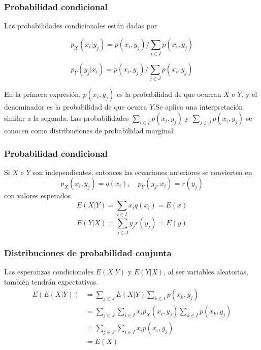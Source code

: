\documentclass[spanish]{beamer}
\begin{document}
\begin{frame}
\frametitle{Probabilidad condicional}  
Las probabilidades condicionales están dadas por

\begin{equation*}
p_{X}(x_{i} \vert y_{j} ) = p(x_{i},y_{j} )/ \sum_{i\in I} p(x_{i},y_{j} )
\end{equation*}

\begin{equation*}
p_{Y}(y_{j} \vert x_{i} ) = p(x_{i},y_{j} )/ \sum_{j\in J} p(x_{i},y_{j} )
\end{equation*}

En la primera expresión, $p(x_{i},y_{j})$ es la probabilidad de que ocurran $X$ e $Y$, y el denominador es la probabilidad de que ocurra $Y$.Se aplica una interpretación similar a la segunda. Las probabilidades $\sum_{i\in I} p(x_{i},y_{j} )$ y $\sum_{j\in J} p(x_{i},y_{j} )$ se conocen como distribuciones de probabilidad marginal.

\end{frame}

\begin{frame}
\frametitle{Probabilidad condicional}  
Si $X$ e $Y$ son independientes, entonces las ecuaciones anteriores se convierten en
\begin{equation*}
p_{X}(x_{i}, y_{j} )= q(x_{i}), \quad p_{Y}(y_{j}, x_{i} ) = r(y_{j})
\end{equation*}
con valores esperados 
\begin{equation*}
E(X\vert Y)= \sum_{i\in I} x_{i}q(x_{i})= E(x)
\end{equation*}
\begin{equation*}
E(Y\vert X)= \sum_{j\in J} y_{j}r(y_{j})= E(y)
\end{equation*}

\end{frame}

\begin{frame}
\frametitle{Distribuciones de probabilidad conjunta}
Las esperanzas condicionales $E (X \vert Y)$ y $E (Y \vert X)$, al ser variables aleatorias, también tendrán expectativas.
\begin{equation*}
\begin{split}
E(E(X\vert Y )) & = \sum_{j\in J} E(X\vert Y) \sum_{k\in I} p(x_{k},y_{j}) \\
 & =  \sum_{j\in J} \sum_{i\in I}x_{i}p_{X}(x_{i},y_{j} ) \sum_{k\in I} p(x_{k},y_{j}) \\
 & =  \sum_{j\in J} \sum_{i\in I}x_{i}p(x_{i},y_{j} )\\
 & = E(X)
\end{split}
\end{equation*}

\end{frame}
\end{document}
